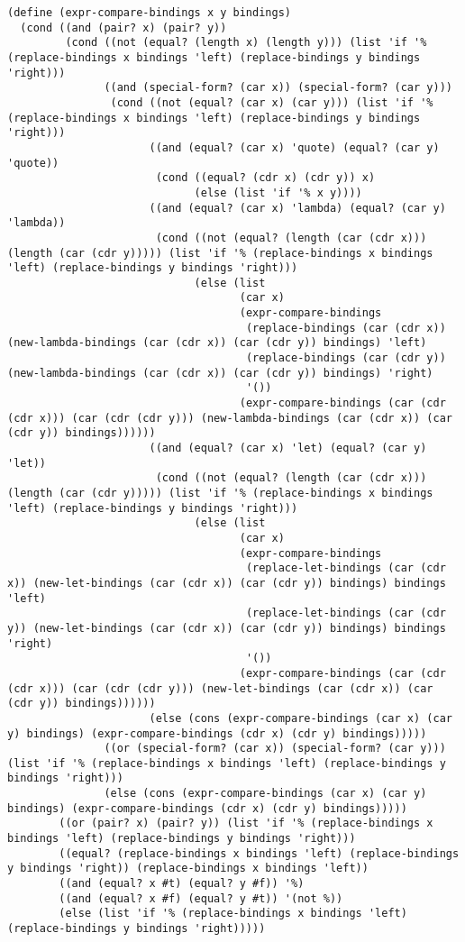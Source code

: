 \documentclass[8pt]{article}
\begin{document}
\begin{verbatim}
(define (expr-compare-bindings x y bindings)
  (cond ((and (pair? x) (pair? y))
         (cond ((not (equal? (length x) (length y))) (list 'if '% (replace-bindings x bindings 'left) (replace-bindings y bindings 'right)))
               ((and (special-form? (car x)) (special-form? (car y)))
                (cond ((not (equal? (car x) (car y))) (list 'if '% (replace-bindings x bindings 'left) (replace-bindings y bindings 'right)))
                      ((and (equal? (car x) 'quote) (equal? (car y) 'quote))
                       (cond ((equal? (cdr x) (cdr y)) x)
                             (else (list 'if '% x y))))
                      ((and (equal? (car x) 'lambda) (equal? (car y) 'lambda))
                       (cond ((not (equal? (length (car (cdr x))) (length (car (cdr y))))) (list 'if '% (replace-bindings x bindings 'left) (replace-bindings y bindings 'right)))
                             (else (list
                                    (car x)
                                    (expr-compare-bindings
                                     (replace-bindings (car (cdr x)) (new-lambda-bindings (car (cdr x)) (car (cdr y)) bindings) 'left)
                                     (replace-bindings (car (cdr y)) (new-lambda-bindings (car (cdr x)) (car (cdr y)) bindings) 'right)
                                     '())
                                    (expr-compare-bindings (car (cdr (cdr x))) (car (cdr (cdr y))) (new-lambda-bindings (car (cdr x)) (car (cdr y)) bindings))))))
                      ((and (equal? (car x) 'let) (equal? (car y) 'let))
                       (cond ((not (equal? (length (car (cdr x))) (length (car (cdr y))))) (list 'if '% (replace-bindings x bindings 'left) (replace-bindings y bindings 'right)))
                             (else (list
                                    (car x)
                                    (expr-compare-bindings
                                     (replace-let-bindings (car (cdr x)) (new-let-bindings (car (cdr x)) (car (cdr y)) bindings) bindings 'left)
                                     (replace-let-bindings (car (cdr y)) (new-let-bindings (car (cdr x)) (car (cdr y)) bindings) bindings 'right)
                                     '())
                                    (expr-compare-bindings (car (cdr (cdr x))) (car (cdr (cdr y))) (new-let-bindings (car (cdr x)) (car (cdr y)) bindings))))))
                      (else (cons (expr-compare-bindings (car x) (car y) bindings) (expr-compare-bindings (cdr x) (cdr y) bindings)))))
               ((or (special-form? (car x)) (special-form? (car y))) (list 'if '% (replace-bindings x bindings 'left) (replace-bindings y bindings 'right)))
               (else (cons (expr-compare-bindings (car x) (car y) bindings) (expr-compare-bindings (cdr x) (cdr y) bindings)))))
        ((or (pair? x) (pair? y)) (list 'if '% (replace-bindings x bindings 'left) (replace-bindings y bindings 'right)))
        ((equal? (replace-bindings x bindings 'left) (replace-bindings y bindings 'right)) (replace-bindings x bindings 'left))
        ((and (equal? x #t) (equal? y #f)) '%)
        ((and (equal? x #f) (equal? y #t)) '(not %))
        (else (list 'if '% (replace-bindings x bindings 'left) (replace-bindings y bindings 'right)))))


\end{verbatim}
\end{document}
